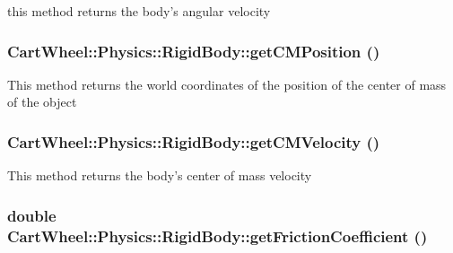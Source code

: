 \label{classCartWheel_1_1Physics_1_1RigidBody_ad0587e004de409e67de60eda3987f98b}
this method returns the body's angular velocity \hypertarget{classCartWheel_1_1Physics_1_1RigidBody_a55bb99a033e6c6808d0a447ca92f9d3d}{
\subsubsection[{getCMPosition}]{ CartWheel::Physics::RigidBody::getCMPosition ()}}
\label{classCartWheel_1_1Physics_1_1RigidBody_a55bb99a033e6c6808d0a447ca92f9d3d}
This method returns the world coordinates of the position of the center of mass of the object \hypertarget{classCartWheel_1_1Physics_1_1RigidBody_a60df7d8402d6bc8bab75cb5b5a790920}{
\subsubsection[{getCMVelocity}]{ CartWheel::Physics::RigidBody::getCMVelocity ()}}
\label{classCartWheel_1_1Physics_1_1RigidBody_a60df7d8402d6bc8bab75cb5b5a790920}
This method returns the body's center of mass velocity \hypertarget{classCartWheel_1_1Physics_1_1RigidBody_a931f7d46adbf71d5d81f3f352f037412}{
\subsubsection[{getFrictionCoefficient}]{\setlength{\rightskip}{0pt plus 5cm}double CartWheel::Physics::RigidBody::getFrictionCoefficient ()}}
\label{classCartWheel_1_1Physics_1_1RigidBody_a931f7d46adbf71d5d81f3f352f037412}
